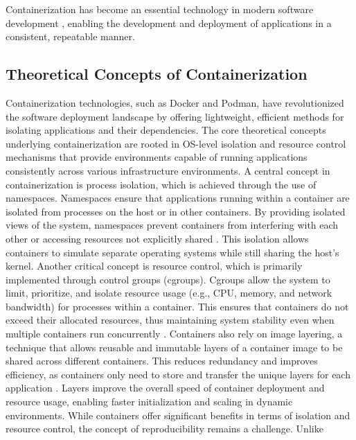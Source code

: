 Containerization has become an essential technology in modern software development
\cite[Docker: a Little Background]{merkelDockerLightweightLinux2014}, enabling the
development and deployment of applications in a consistent, repeatable manner.

\subsection{Theoretical Concepts of Containerization}

Containerization technologies, such as Docker and Podman, have revolutionized
the software deployment landscape by offering lightweight, efficient methods
for isolating applications and their dependencies. The core theoretical
concepts underlying containerization are rooted in OS-level isolation and
resource control mechanisms that provide environments capable of running
applications consistently across various infrastructure environments.
A central concept in containerization is process isolation, which is
achieved through the use of namespaces. Namespaces ensure that
applications running within a container are isolated from processes on the
host or in other containers. By providing isolated views of the system,
namespaces prevent containers from interfering with each other or accessing
resources not explicitly shared \cite{Cgroups2024}. This isolation allows
containers to simulate separate operating systems while still sharing the
host's kernel.
Another critical concept is resource control, which is primarily
implemented through control groups (cgroups). Cgroups allow
the system to limit, prioritize, and isolate resource usage (e.g., CPU, memory,
and network bandwidth) for processes within a container. This ensures that
containers do not exceed their allocated resources, thus maintaining system
stability even when multiple containers run concurrently
\cite[Under the Hood]{merkelDockerLightweightLinux2014}.
Containers also rely on image layering, a technique that allows
reusable and immutable layers of a container image to be shared across
different containers. This reduces redundancy and improves efficiency, as
containers only need to store and transfer the unique layers for each
application \cite[Chapter 2.4]{merkelDockerLightweightLinux2014}. Layers
improve the overall speed of container deployment and resource usage,
enabling faster initialization and scaling in dynamic environments.
While containers offer significant benefits in terms of isolation and resource
control, the concept of reproducibility remains a challenge. Unlike
